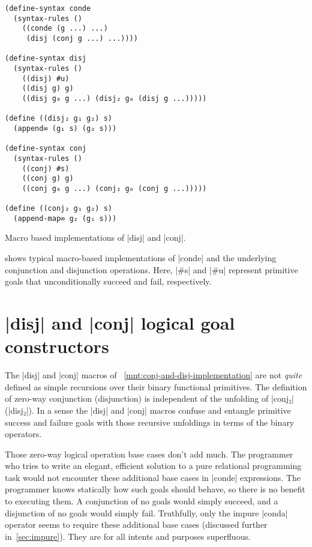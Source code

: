 \documentclass[sigplan,screen,draft,anonymous,review,natbib=false]{acmart}
\begin{document}
\begin{listing}
  \begin{verbatim}
(define-syntax conde
  (syntax-rules ()
    ((conde (g ...) ...)
     (disj (conj g ...) ...))))

(define-syntax disj
  (syntax-rules ()
    ((disj) #u)
    ((disj g) g)
    ((disj g₀ g ...) (disj₂ g₀ (disj g ...)))))

(define ((disj₂ g₁ g₂) s)
  (append∞ (g₁ s) (g₂ s)))

(define-syntax conj
  (syntax-rules ()
    ((conj) #s)
    ((conj g) g)
    ((conj g₀ g ...) (conj₂ g₀ (conj g ...)))))

(define ((conj₂ g₁ g₂) s)
  (append-map∞ g₂ (g₁ s)))
  \end{verbatim}
  \caption{Macro based implementations of  \rackinline|disj| and \rackinline|conj|.}
  \label{mnt:conj-and-disj-implementation}
\end{listing}

 shows typical macro-based
implementations of \rackinline|conde| and the underlying conjunction
and disjunction operations. Here, \rackinline|#s| and \rackinline|#u|
represent primitive goals that unconditionally succeed and fail,
respectively.

\section{\rackinline|disj| and \rackinline|conj| logical goal
  constructors}\label{sec:conde}

The  \rackinline|disj| and \rackinline|conj| macros of
~\cref{mnt:conj-and-disj-implementation} are not \emph{quite} defined
as simple recursions over their binary functional primitives. The
definition of zero-way conjunction (disjunction) is independent of the
unfolding of \rackinline|conj₂| (\rackinline|disj₂|). In a sense the
\rackinline|disj| and \rackinline|conj| macros confuse and entangle
primitive success and failure goals with those recursive unfoldings in
terms of the binary operators.

Those zero-way logical operation base cases don't add much. The
programmer who tries to write an elegant, efficient solution to a pure
relational programming task would not encounter these additional base
cases in \rackinline|conde| expressions. The programmer knows
statically how such goals should behave, so there is no benefit to
executing them. A conjunction of no goals would simply succeed, and a
disjunction of no goals would simply fail. Truthfully, only the impure
\rackinline|conda| operator seems to require these additional base
cases (discussed further in~\cref{sec:impure}). They are for all
intents and purposes superfluous.
\end{document}
